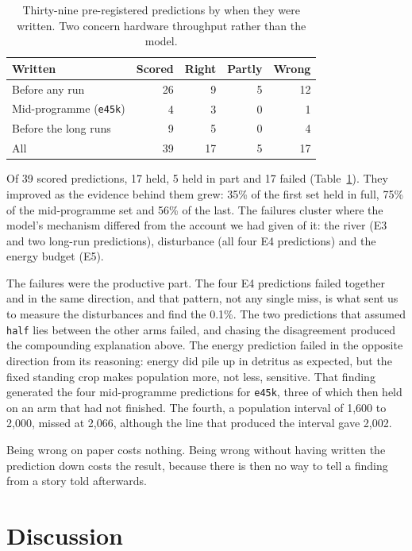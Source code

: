 \documentclass[letterpaper]{article}
\newcommand{\cond}[1]{\texttt{#1}}
\begin{document}
\begin{table}[t]
\centering
\footnotesize
\caption{Thirty-nine pre-registered predictions by when they were written. Two concern hardware
throughput rather than the model.}
\label{tab:score}
\setlength\tabcolsep{4pt}
\begin{tabular}{@{}lrrrr@{}}
\toprule
Written & Scored & Right & Partly & Wrong \\
\midrule
Before any run             & 26 & 9  & 5 & 12 \\
Mid-programme (\cond{e45k}) & 4  & 3  & 0 & 1 \\
Before the long runs       & 9  & 5  & 0 & 4 \\
\midrule
All                        & 39 & 17 & 5 & 17 \\
\bottomrule
\end{tabular}
\end{table}

Of 39 scored predictions, 17 held, 5 held in part and 17 failed (Table~\ref{tab:score}). They improved
as the evidence behind them grew: 35\% of the first set held in full, 75\% of the mid-programme set
and 56\% of the last. The failures cluster where the model's mechanism differed from the account we
had given of it: the river (E3 and two long-run predictions), disturbance (all four E4 predictions) and
the energy budget (E5).

The failures were the productive part. The four E4 predictions failed together and in the same
direction, and that pattern, not any single miss, is what sent us to measure the disturbances and find
the 0.1\%. The two predictions that assumed \cond{half} lies between the other arms failed, and
chasing the disagreement produced the compounding explanation above. The energy prediction failed in
the opposite direction from its reasoning: energy did pile up in detritus as expected, but the fixed
standing crop makes population more, not less, sensitive. That finding generated the four
mid-programme predictions for \cond{e45k}, three of which then held on an arm that had not finished.
The fourth, a population interval of 1,600 to 2,000, missed at 2,066, although the line that produced
the interval gave 2,002.

Being wrong on paper costs nothing. Being wrong without having written the prediction down costs the
result, because there is then no way to tell a finding from a story told afterwards.

\section{Discussion}
\end{document}
